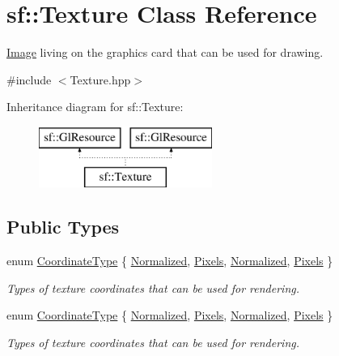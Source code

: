 \hypertarget{classsf_1_1_texture}{\section{sf\-:\-:Texture Class Reference}
\label{classsf_1_1_texture}
}


\hyperlink{classsf_1_1_image}{Image} living on the graphics card that can be used for drawing.  




{\ttfamily \#include $<$Texture.\-hpp$>$}

Inheritance diagram for sf\-:\-:Texture\-:\begin{figure}[H]
\begin{center}
\leavevmode
\includegraphics[height=2.000000cm]{classsf_1_1_texture}
\end{center}
\end{figure}
\subsection*{Public Types}
\begin{DoxyCompactItemize}
\item 
enum \hyperlink{classsf_1_1_texture_aa6fd3bbe3c334b3c4428edfb2765a82e}{Coordinate\-Type} \{ \hyperlink{classsf_1_1_texture_aa6fd3bbe3c334b3c4428edfb2765a82ea3b684a2e0aa92c07a074864d0ea17f51}{Normalized}, 
\hyperlink{classsf_1_1_texture_aa6fd3bbe3c334b3c4428edfb2765a82eaef6f1159be622a46cd9ae35d44bbc790}{Pixels}, 
\hyperlink{classsf_1_1_texture_aa6fd3bbe3c334b3c4428edfb2765a82ea3b684a2e0aa92c07a074864d0ea17f51}{Normalized}, 
\hyperlink{classsf_1_1_texture_aa6fd3bbe3c334b3c4428edfb2765a82eaef6f1159be622a46cd9ae35d44bbc790}{Pixels}
 \}
\begin{DoxyCompactList}\small\item\em Types of texture coordinates that can be used for rendering. \end{DoxyCompactList}\item 
enum \hyperlink{classsf_1_1_texture_aa6fd3bbe3c334b3c4428edfb2765a82e}{Coordinate\-Type} \{ \hyperlink{classsf_1_1_texture_aa6fd3bbe3c334b3c4428edfb2765a82ea3b684a2e0aa92c07a074864d0ea17f51}{Normalized}, 
\hyperlink{classsf_1_1_texture_aa6fd3bbe3c334b3c4428edfb2765a82eaef6f1159be622a46cd9ae35d44bbc790}{Pixels}, 
\hyperlink{classsf_1_1_texture_aa6fd3bbe3c334b3c4428edfb2765a82ea3b684a2e0aa92c07a074864d0ea17f51}{Normalized}, 
\hyperlink{classsf_1_1_texture_aa6fd3bbe3c334b3c4428edfb2765a82eaef6f1159be622a46cd9ae35d44bbc790}{Pixels}
 \}
\begin{DoxyCompactList}\small\item\em Types of texture coordinates that can be used for rendering. \end{DoxyCompactList}\end{DoxyCompactItemize}
